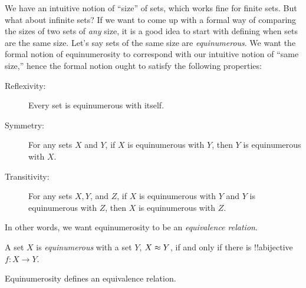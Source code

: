 \documentclass[../../../include/open-logic-section]{subfiles}
\begin{document}


\begin{intro}
We have an intuitive notion of ``size'' of sets, which works fine for
finite sets. But what about infinite sets? If we want to come up with
a formal way of comparing the sizes of two sets of \emph{any} size, it
is a good idea to start with defining when sets are the same size.
Let's say sets of the same size are \emph{equinumerous}. We want the
formal notion of equinumerosity to correspond with our intuitive
notion of ``same size,'' hence the formal notion ought to satisfy the
following properties:

\begin{description}
\item[Reflexivity:] Every set is equinumerous with itself.
\item[Symmetry:] For any sets $X$ and $Y$, if $X$ is equinumerous with
  $Y$, then $Y$ is equinumerous with $X$.
\item[Transitivity:] For any sets $X, Y$, and $Z$, if $X$ is
  equinumerous with $Y$ and $Y$ is equinumerous with $Z$, then $X$ is
  equinumerous with $Z$.
\end{description}

In other words, we want equinumerosity to be an
\emph{equivalence relation}.
\end{intro}

\begin{defn}
A set $X$ is \emph{equinumerous} with a set $Y$, $X \approx Y$, if
and only if there is !!a{bijective} $f \colon X \to Y$.
\end{defn}

\begin{prop}
Equinumerosity defines an equivalence relation.
\end{prop}
\end{document}

